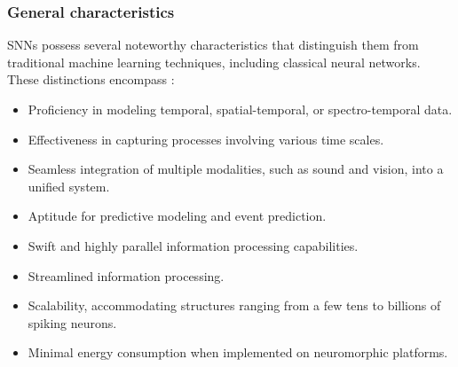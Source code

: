 \begin{frame}
	\frametitle{General characteristics}
	
	\par SNNs possess several noteworthy characteristics that distinguish them from traditional machine learning techniques, including classical neural networks. These distinctions encompass \cite{kasabov2019time}:
	
	\begin{itemize}
		\item Proficiency in modeling temporal, spatial-temporal, or spectro-temporal data.
		\item Effectiveness in capturing processes involving various time scales.
		\item Seamless integration of multiple modalities, such as sound and vision, into a unified system.
		\item Aptitude for predictive modeling and event prediction.
		\item Swift and highly parallel information processing capabilities.
		\item Streamlined information processing.
		\item Scalability, accommodating structures ranging from a few tens to billions of spiking neurons.
		\item Minimal energy consumption when implemented on neuromorphic platforms.
	\end{itemize}

\end{frame}

